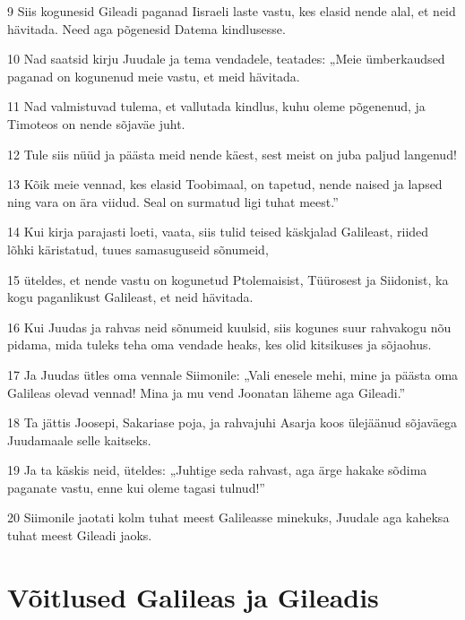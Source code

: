 \par 9 Siis kogunesid Gileadi paganad Iisraeli laste vastu, kes elasid nende alal, et neid hävitada. Need aga põgenesid Datema kindlusesse.
\par 10 Nad saatsid kirju Juudale ja tema vendadele, teatades: „Meie ümberkaudsed paganad on kogunenud meie vastu, et meid hävitada.
\par 11 Nad valmistuvad tulema, et vallutada kindlus, kuhu oleme põgenenud, ja Timoteos on nende sõjaväe juht.
\par 12 Tule siis nüüd ja päästa meid nende käest, sest meist on juba paljud langenud!
\par 13 Kõik meie vennad, kes elasid Toobimaal, on tapetud, nende naised ja lapsed ning vara on ära viidud. Seal on surmatud ligi tuhat meest.”
\par 14 Kui kirja parajasti loeti, vaata, siis tulid teised käskjalad Galileast, riided lõhki käristatud, tuues samasuguseid sõnumeid,
\par 15 üteldes, et nende vastu on kogunetud Ptolemaisist, Tüürosest ja Siidonist, ka kogu paganlikust Galileast, et neid hävitada.
\par 16 Kui Juudas ja rahvas neid sõnumeid kuulsid, siis kogunes suur rahvakogu nõu pidama, mida tuleks teha oma vendade heaks, kes olid kitsikuses ja sõjaohus.
\par 17 Ja Juudas ütles oma vennale Siimonile: „Vali enesele mehi, mine ja päästa oma Galileas olevad vennad! Mina ja mu vend Joonatan läheme aga Gileadi.”
\par 18 Ta jättis Joosepi, Sakariase poja, ja rahvajuhi Asarja koos ülejäänud sõjaväega Juudamaale selle kaitseks.
\par 19 Ja ta käskis neid, üteldes: „Juhtige seda rahvast, aga ärge hakake sõdima paganate vastu, enne kui oleme tagasi tulnud!”
\par 20 Siimonile jaotati kolm tuhat meest Galileasse minekuks, Juudale aga kaheksa tuhat meest Gileadi jaoks. 

\section*{Võitlused Galileas ja Gileadis}

